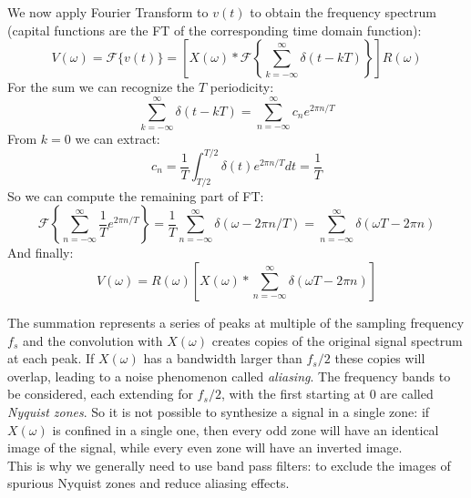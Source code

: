 We now apply Fourier Transform to $v(t)$ to obtain the frequency spectrum (capital functions are the FT of the corresponding time domain function):
\begin{equation*}
    V(\omega) = \mathcal{F}\{v(t)\}=\left[X(\omega) * \mathcal{F} \left\{\sum^\infty_{k=-\infty} \delta (t - kT)  \right\}\right] R(\omega)
\end{equation*}
For the sum we can recognize the $T$ periodicity:
\begin{equation*}
    \sum^\infty_{k=-\infty} \delta (t - kT)  = \sum^\infty_{n=-\infty} c_n e^{2\pi n / T}
\end{equation*}
From $k=0$ we can extract:
\begin{equation*}
    c_n = \frac{1}{T}\int^{T/2}_{T/2} \delta(t) e ^{2\pi n / T}dt = \frac{1}{T}
\end{equation*}
So we can compute the remaining part of FT:
\begin{equation*}
    \mathcal{F} \left\{\sum^\infty_{n=-\infty} \frac{1}{T} e^{2\pi n / T}  \right\} = \frac{1}{T}\sum^\infty_{n=-\infty}\delta (\omega - 2\pi n / T) = \sum^\infty_{n=-\infty} \delta (\omega T - 2\pi n)
\end{equation*}
And finally:
\begin{equation}
    V(\omega) = R(\omega) \left[ X(\omega) * \sum^\infty_{n=-\infty} \delta ( \omega T - 2\pi n) \right]
\end{equation}

The summation represents a series of peaks at multiple of the sampling frequency $f_s$ and the convolution with $X(\omega)$ creates copies of the original signal spectrum at each peak.
If $X(\omega)$ has a bandwidth larger than $f_s/2$ these copies will overlap, leading to a noise phenomenon called \textit{aliasing}.
The frequency bands to be considered, each extending for $f_s/2$, with the first starting at $0$ are called \textit{Nyquist zones}.
So it is not possible to synthesize a signal in a single zone: if $X(\omega)$ is confined in a single one, then every odd zone will have an identical image of the signal, while every even zone will have an inverted image.\\
This is why we generally need to use band pass filters: to exclude the images of spurious Nyquist zones and reduce aliasing effects.

